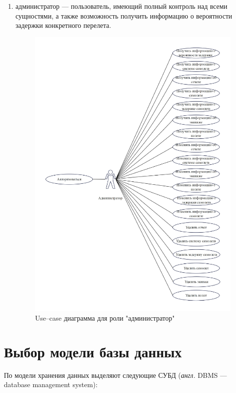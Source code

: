 \begin{enumerate}[label=\arabic*)]
    \item администратор --- пользователь, имеющий полный контроль над всеми сущностями, а также возможность получить информацию о вероятности задержки конкретного перелета.
    \begin{figure}[H]
        \centering
        \includegraphics[scale=0.7]{inc/Admin_role}
        \caption{Use--case диаграмма для роли "администратор"}
        \label{fig:admin_role}
    \end{figure}
\end{enumerate}
\newpage


\section{Выбор модели базы данных}
По модели хранения данных выделяют следующие СУБД \newline(\textit{англ.} DBMS --- database management system):

